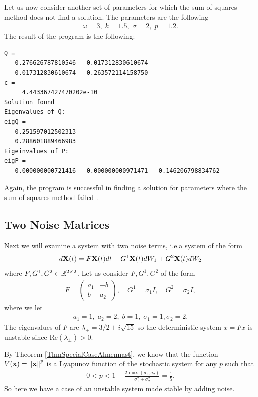 \documentclass[a4paper,12pt,twoside,BCOR=10mm]{scrbook}
\begin{document}
Let us now consider another set of parameters for which the sum-of-squares method does not find a solution. The parameters are the following
\begin{align*}
    \omega = 3, \; k = 1.5, \; \sigma = 2, \; p = 1.2.
\end{align*}
The result of the program is the following:
\begin{lstlisting}
Q =
   0.276626787810546   0.017312830610674
   0.017312830610674   0.263572114158750
c =
     4.443367427470202e-10
Solution found
Eigenvalues of Q:
eigQ =
   0.251597012502313
   0.288601889466983
Eigeinvalues of P:
eigP =
   0.000000000721416   0.000000000971471   0.146206798834762
\end{lstlisting}
Again, the program is successful in finding a solution for parameters where the sum-of-squares method failed \citep{HGGS2018localLya}.

\subsection{Two Noise Matrices}
Next we will examine a system with two noise terms, i.e.\@ a system of the form
\begin{align*}
    d\mathbf{X}(t) = F\mathbf{X}(t)dt + G^1\mathbf{X}(t)dW_1 + G^2\mathbf{X}(t)dW_2
\end{align*}
where $F,G^1,G^2\in \mathbb{R}^{2\times 2}$. Let us consider $F, G^1, G^2$ of the form
\begin{align*}
    F = \begin{pmatrix}
    a_1 & -b\\
    b & a_2
    \end{pmatrix}
    , \quad
    G^1 = \sigma_1 I
    , \quad
    G^2 = \sigma_2 I,
\end{align*}
where we let
\begin{align*}
    a_1 = 1,\; a_2 = 2,\; b = 1, \; \sigma_1 = 1, \sigma_2 = 2.
\end{align*}
The eigenvalues of $F$ are $\lambda_{\pm} = 3/2 \pm i\sqrt{15}$ so the deterministic system $\Dot{x} = Fx$ is unstable since $\text{Re}(\lambda_\pm) > 0$.

By Theorem \ref{ThmSpecialCaseAlmennast}, we know that the function $V(\mathbf{x}) = \left\lVert\mathbf{x}\right\rVert_{}^{p}$ is a Lyapunov function of the stochastic system for any $p$ such that
\begin{align*}
    0 < p < 1 - \frac{2\max{(a_1, a_2)}}{\sigma_1^2 + \sigma_2^2} = \frac{1}{5}.
\end{align*}
So here we have a case of an unstable system made stable by adding noise.
\end{document}
